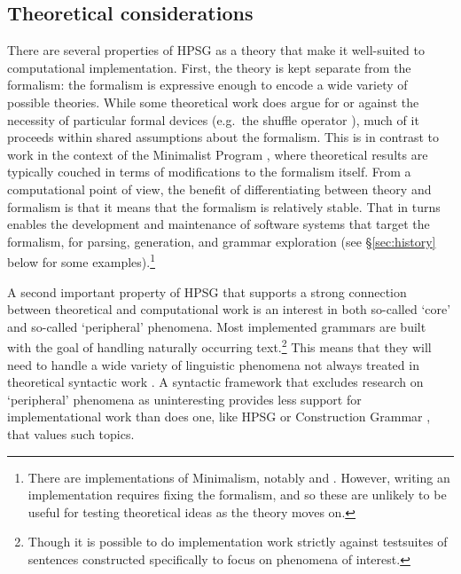 \documentclass[output=paper]{langsci/langscibook}
\begin{document}
\subsection{Theoretical considerations}
\label{sec:theoretical}

There are several properties of HPSG as a theory that make it well-suited to computational implementation. First, the theory is kept separate from the formalism: the formalism is expressive enough to encode a wide variety of possible theories. While some theoretical work does argue for or against the necessity of particular formal devices (e.g.\ the shuffle operator \citep{FIXME-Reape}), much of it proceeds within shared assumptions about the formalism. This is in contrast to work in the context of the Minimalist Program \citep{Chomsky93b-u}, where theoretical results are typically couched in terms of modifications to the formalism itself. From a computational point of view, the benefit of differentiating between theory and formalism is that it means that the formalism is relatively stable. That in turns enables the development and maintenance of software systems that target the formalism, for parsing, generation, and grammar exploration (see \S\ref{sec:history} below for some examples).\footnote{There are implementations of Minimalism, notably \citet{FIXME-Stabler} and \citet{FIXME-Indianadiss}. However, writing an implementation requires fixing the formalism, and so these are unlikely to be useful for testing theoretical ideas as the theory moves on.}

A second important property of HPSG that supports a strong connection between theoretical and computational work is an interest in both so-called `core' and so-called `peripheral' phenomena. Most implemented grammars are built with the goal of handling naturally occurring text.\footnote{Though it is possible to do implementation work strictly against testsuites of sentences constructed specifically to focus on phenomena of interest.} This means that they will need to handle a wide variety of linguistic phenomena not always treated in theoretical syntactic work \citep{FIXME-Baldwin-et-al-Beauty}. A syntactic framework that excludes research on `peripheral' phenomena as uninteresting provides less support for implementational work than does one, like HPSG or Construction Grammar \citep{FIXME}, that values such topics.
\end{document}

